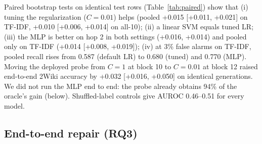 \documentclass[11pt]{article}
\begin{document}
Paired bootstrap tests on identical test rows (Table~\ref{tab:paired}) show that (i) tuning the regularization ($C{=}0.01$) helps (pooled +0.015 [+0.011, +0.021] on TF-IDF, +0.010 [+0.006, +0.014] on all-10); (ii) a linear SVM equals tuned LR; (iii) the MLP is better on hop 2 in both settings (+0.016, +0.014) and pooled only on TF-IDF (+0.014 [+0.008, +0.019]); (iv) at 3\% false alarms on TF-IDF, pooled recall rises from 0.587 (default LR) to 0.680 (tuned) and 0.770 (MLP). Moving the deployed probe from $C{=}1$ at block 10 to $C{=}0.01$ at block 12 raised end-to-end 2Wiki accuracy by +0.032 [+0.016, +0.050] on identical generations. We did not run the MLP end to end: the probe already obtains 94\% of the oracle's gain (below). Shuffled-label controls give AUROC 0.46--0.51 for every model.

\subsection{End-to-end repair (RQ3)}
\end{document}

